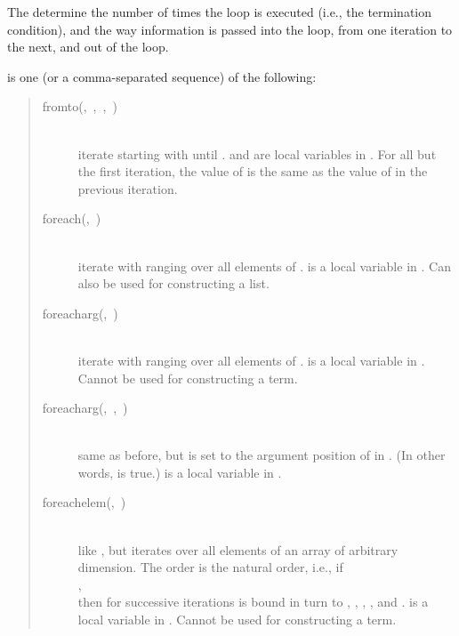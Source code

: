 The  determine the number of times the loop is executed
(i.e., the termination condition), and the way information is passed
into the loop, from one iteration to the next, and out of the loop.

 is one (or a comma-separated sequence) of the following:

\begin{quote}
\begin{description}
\item[fromto(,~,~,~)]%
\mbox{}\\
    iterate  starting with  until
    .
     and  are local variables in .
    For all but the first iteration, the value of  is the same as the
    value of  in the previous iteration.

\item[foreach(,~)]%
\mbox{}\\
    iterate  with  ranging over all elements of
    .
     is a local variable in .
    Can also be used for constructing a list.

\item[foreacharg(,~)]%
\mbox{}\\
    iterate  with  ranging over all elements of
    .
     is a local variable in .
    Cannot be used for constructing a term.

\item[foreacharg(,~,~)]
\mbox{}\\
    same as before, but  is set to the argument position of 
    in . (In other words,  is true.)
     is a local variable in .

\item[foreachelem(,~)]%
\mbox{}\\
    like , but iterates over all elements of an array
    of arbitrary dimension.  The order is the natural order, i.e.,
    if\\
    \hbox{\hspace{2em}},\\
    then for successive
    iterations  is bound in turn to , , ,
    ,  and .
     is a local variable in .
    Cannot be used for constructing a term.


\end{description}
\end{quote}
